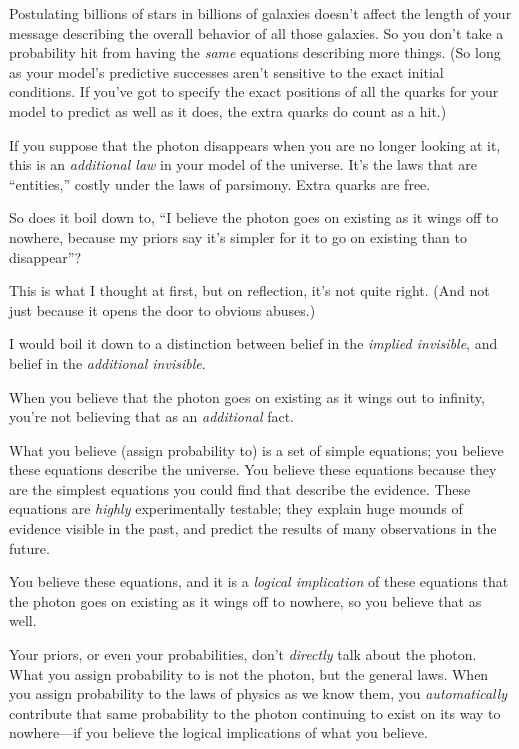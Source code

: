 {
 Postulating billions of stars in billions of galaxies
doesn't affect the length of your message describing
the overall behavior of all those galaxies. So you
don't take a probability hit from having the
\textit{same} equations describing more things. (So long as your
model's predictive successes aren't
sensitive to the exact initial conditions. If you've
got to specify the exact positions of all the quarks for your model to
predict as well as it does, the extra quarks do count as a hit.)}

{
 If you suppose that the photon disappears when you are no longer
looking at it, this is an \textit{additional law} in your model of the
universe. It's the laws that are
``entities,'' costly under the laws
of parsimony. Extra quarks are free.}

{
 So does it boil down to, ``I believe the photon
goes on existing as it wings off to nowhere, because my priors say
it's simpler for it to go on existing than to
disappear''?}

{
 This is what I thought at first, but on reflection,
it's not quite right. (And not just because it opens
the door to obvious abuses.)}

{
 I would boil it down to a distinction between belief in the
\textit{implied invisible}, and belief in the \textit{additional
invisible}.}

{
 When you believe that the photon goes on existing as it wings out
to infinity, you're not believing that as an
\textit{additional} fact.}

{
 What you believe (assign probability to) is a set of simple
equations; you believe these equations describe the universe. You
believe these equations because they are the simplest equations you
could find that describe the evidence. These equations are
\textit{highly} experimentally testable; they explain huge mounds of
evidence visible in the past, and predict the results of many
observations in the future.}

{
 You believe these equations, and it is a \textit{logical
implication} of these equations that the photon goes on existing as it
wings off to nowhere, so you believe that as well.}

{
 Your priors, or even your probabilities, don't
\textit{directly} talk about the photon. What you assign probability to
is not the photon, but the general laws. When you assign probability to
the laws of physics as we know them, you \textit{automatically}
contribute that same probability to the photon continuing to exist on
its way to nowhere---if you believe the logical implications of what
you believe.}

